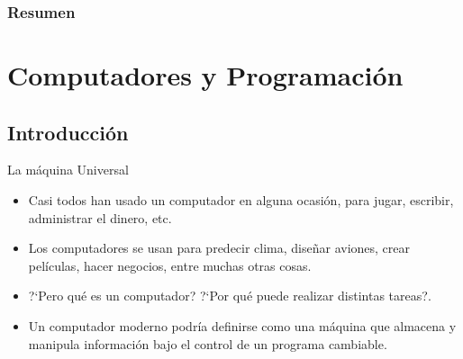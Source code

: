 \documentclass[10pt]{beamer}
\begin{document}
\myfront{}

\begin{frame}
  \titlepage
\end{frame}

\begin{frame}
  \frametitle{Resumen}
  \tableofcontents
\end{frame}



\section{Computadores y Programaci\'on}
\subsection{Introducci\'on}

\begin{frame}{La m\'aquina Universal}
	\begin{itemize}
		\item Casi todos han usado un computador en alguna ocasi\'on, para jugar, escribir,  
		administrar el dinero, etc.
		\item Los computadores se usan para predecir clima, dise\~nar aviones, crear pel\'iculas, 
		hacer negocios, entre muchas otras cosas.
		\item ?`Pero qu\'e es un computador? ?`Por qu\'e puede realizar distintas tareas?.
		\item Un computador moderno podr\'ia definirse como una m\'aquina que almacena y manipula 
		informaci\'on bajo el control de un programa cambiable.
	\end{itemize}
\end{frame}
\end{document}

